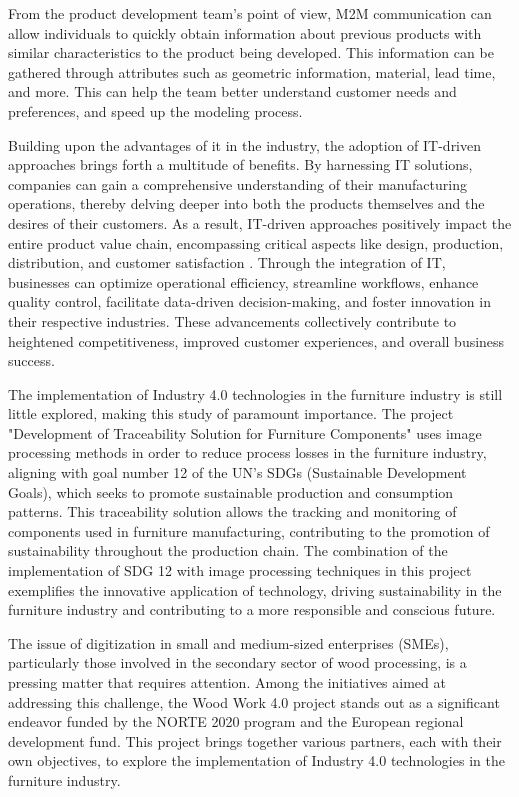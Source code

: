 From the product development team's point of view, M2M communication can allow individuals to quickly obtain information about previous products with similar characteristics to the product being developed. This information can be gathered through attributes such as geometric information, material, lead time, and more. This can help the team better understand customer needs and preferences, and speed up the modeling process.

Building upon the advantages of \acrfull{it} in the industry, the adoption of IT-driven approaches brings forth a multitude of benefits. By harnessing IT solutions, companies can gain a comprehensive understanding of their manufacturing operations, thereby delving deeper into both the products themselves and the desires of their customers. As a result, IT-driven approaches positively impact the entire product value chain, encompassing critical aspects like design, production, distribution, and customer satisfaction \cite{economies6030046}. Through the integration of IT, businesses can optimize operational efficiency, streamline workflows, enhance quality control, facilitate data-driven decision-making, and foster innovation in their respective industries. These advancements collectively contribute to heightened competitiveness, improved customer experiences, and overall business success.

The implementation of Industry 4.0 technologies in the furniture industry is still little explored, making this study of paramount importance. The project "Development of Traceability Solution for Furniture Components" uses image processing methods in order to reduce process losses in the furniture industry, aligning with goal number 12 of the UN's SDGs (Sustainable Development Goals), which seeks to promote sustainable production and consumption patterns. This traceability solution allows the tracking and monitoring of components used in furniture manufacturing, contributing to the promotion of sustainability throughout the production chain. The combination of the implementation of SDG 12 with image processing techniques in this project exemplifies the innovative application of technology, driving sustainability in the furniture industry and contributing to a more responsible and conscious future.

The issue of digitization in small and medium-sized enterprises (SMEs), particularly those involved in the secondary sector of wood processing, is a pressing matter that requires attention. Among the initiatives aimed at addressing this challenge, the Wood Work 4.0 project stands out as a significant endeavor funded by the NORTE 2020 program and the European regional development fund. This project brings together various partners, each with their own objectives, to explore the implementation of Industry 4.0 technologies in the furniture industry.

